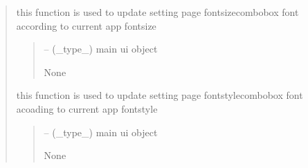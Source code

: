\documentclass[letterpaper,10pt,english]{sphinxmanual}
\begin{document}
\begin{quote}
\begin{savenotes}\begin{fulllineitems}
\label{\detokenize{setting/backend/mainsetting_funcs:oxin.backend.mainsetting_funcs.update_combo_fontsize}}
\pysigstartsignatures
{}
\pysigstopsignatures
\sphinxAtStartPar
this function is used to update setting page fontsize\sphinxhyphen{}combobox font according to current app fontsize
\begin{quote}\begin{description}
\sphinxAtStartPar
{} – (\_type\_) main ui object

\sphinxAtStartPar
None

\end{description}\end{quote}

\end{fulllineitems}\end{savenotes}


\begin{savenotes}\begin{fulllineitems}
\label{\detokenize{setting/backend/mainsetting_funcs:oxin.backend.mainsetting_funcs.update_combo_fontstyle}}
\pysigstartsignatures
{}
\pysigstopsignatures
\sphinxAtStartPar
this function is used to update setting page fontstyle\sphinxhyphen{}combobox font acoading to current app fontstyle
\begin{quote}\begin{description}
\sphinxAtStartPar
{} – (\_type\_) main ui object

\sphinxAtStartPar
None

\end{description}\end{quote}

\end{fulllineitems}\end{savenotes}



\end{quote}
\end{document}
